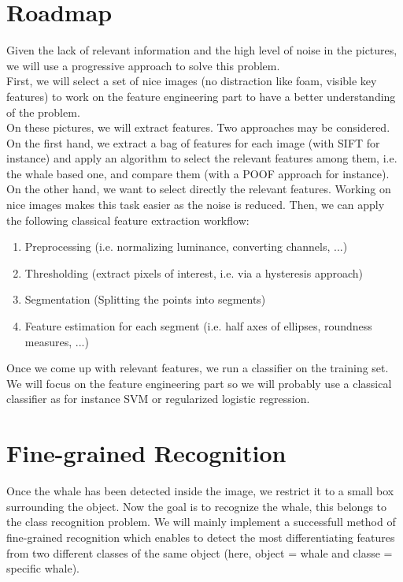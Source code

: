 \documentclass[11pt,a4paper,oneside]{report}
\begin{document}
\section*{Roadmap}
Given the lack of relevant information and the high level of noise in the pictures, we will use a progressive approach to solve this problem. \\
First, we will select a set of nice images (no distraction like foam, visible key features) to work on the feature engineering part to have a better understanding of the problem.\\
On these pictures, we will extract features. Two approaches may be considered. On the first hand, we extract a bag of features for each image (with SIFT for instance) and apply an algorithm to select the relevant features among them, i.e. the whale based one, and compare them (with a POOF approach for instance). On the other hand, we want to select directly the relevant features. Working on nice images makes this task easier as the noise is reduced. Then, we can apply the following classical feature extraction workflow:
\begin{enumerate}
	\item Preprocessing (i.e. normalizing luminance, converting channels, ...)
	\item Thresholding (extract pixels of interest, i.e. via a hysteresis approach)
   	\item Segmentation (Splitting the points into segments)
    	\item Feature estimation for each segment (i.e. half axes of ellipses, roundness measures, ...)
\end{enumerate}
Once we come up with relevant features, we run a classifier on the training set. We will focus on the feature engineering part so we will probably use a classical classifier as for instance SVM or regularized logistic regression. 


\section*{Fine-grained Recognition}

Once the whale has been detected inside the image, we restrict it to a small box surrounding the object. Now the goal is to recognize the whale, this belongs to the class recognition problem. We will mainly implement a successfull method of fine-grained recognition which enables to detect the most differentiating features from two different classes of the same object (here, object = whale and classe = specific whale).
\end{document}
